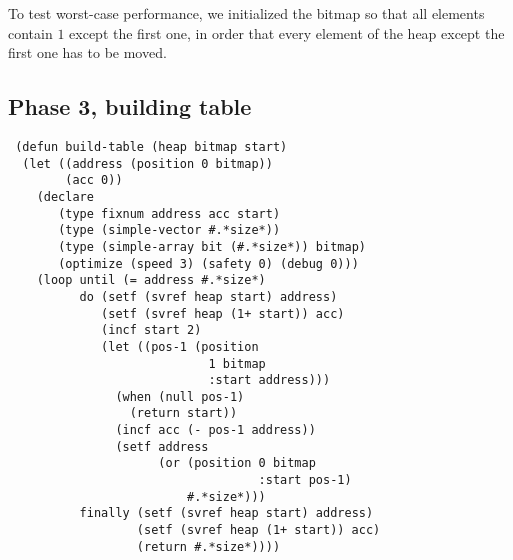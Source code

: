 To test worst-case performance, we initialized the bitmap so that all
elements contain $1$ except the first one, in order that every element
of the heap except the first one has to be moved.  

\subsection{Phase 3, building table}

\begin{verbatim}
 (defun build-table (heap bitmap start)
  (let ((address (position 0 bitmap))
        (acc 0))
    (declare 
       (type fixnum address acc start)
       (type (simple-vector #.*size*))
       (type (simple-array bit (#.*size*)) bitmap)
       (optimize (speed 3) (safety 0) (debug 0)))
    (loop until (= address #.*size*)
          do (setf (svref heap start) address)
             (setf (svref heap (1+ start)) acc)
             (incf start 2)
             (let ((pos-1 (position 
                            1 bitmap 
                            :start address)))
               (when (null pos-1)
                 (return start))
               (incf acc (- pos-1 address))
               (setf address 
                     (or (position 0 bitmap 
                                   :start pos-1)
                         #.*size*)))
          finally (setf (svref heap start) address)
                  (setf (svref heap (1+ start)) acc)
                  (return #.*size*))))
\end{verbatim}
